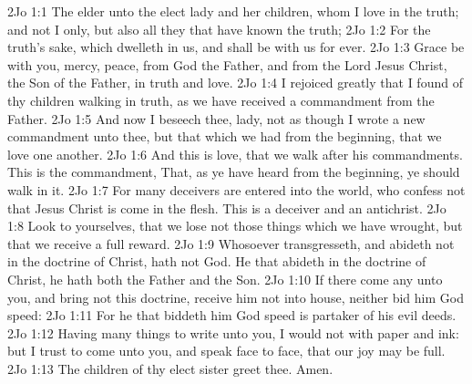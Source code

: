 \vs 2Jo 1:1 The elder unto the elect lady and her children, whom I love in the truth; and not I only, but also all they that have known the truth;
\vs 2Jo 1:2 For the truth's sake, which dwelleth in us, and shall be with us for ever.
\vs 2Jo 1:3 Grace be with you, mercy,  peace, from God the Father, and from the Lord Jesus Christ, the Son of the Father, in truth and love.
\vs 2Jo 1:4 I rejoiced greatly that I found of thy children walking in truth, as we have received a commandment from the Father.
\vs 2Jo 1:5 And now I beseech thee, lady, not as though I wrote a new commandment unto thee, but that which we had from the beginning, that we love one another.
\vs 2Jo 1:6 And this is love, that we walk after his commandments. This is the commandment, That, as ye have heard from the beginning, ye should walk in it.
\vs 2Jo 1:7 For many deceivers are entered into the world, who confess not that Jesus Christ is come in the flesh. This is a deceiver and an antichrist.
\vs 2Jo 1:8 Look to yourselves, that we lose not those things which we have wrought, but that we receive a full reward.
\vs 2Jo 1:9 Whosoever transgresseth, and abideth not in the doctrine of Christ, hath not God. He that abideth in the doctrine of Christ, he hath both the Father and the Son.
\vs 2Jo 1:10 If there come any unto you, and bring not this doctrine, receive him not into  house, neither bid him God speed:
\vs 2Jo 1:11 For he that biddeth him God speed is partaker of his evil deeds.
\vs 2Jo 1:12 Having many things to write unto you, I would not  with paper and ink: but I trust to come unto you, and speak face to face, that our joy may be full.
\vs 2Jo 1:13 The children of thy elect sister greet thee. Amen.

